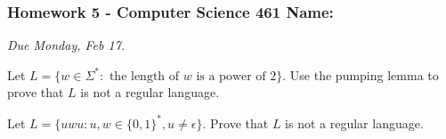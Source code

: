 \documentclass[12pt,answers]{exam}
\begin{document}
\pagestyle{empty}
\subsubsection*{Homework 5 - Computer Science 461 \hfill Name: \underline{\hspace*{2in}}}

\textit{Due Monday, Feb 17.} %

\begin{questions}


\question Let $L = \{w \in \Sigma^* : \text{ the length of }w\text{ is a power of 2} \}$. Use the pumping lemma to prove that $L$ is not a regular language.  

\vfill

\question Let $L = \{u w u : u, w \in \{0,1\}^*, u \ne \epsilon \}$. Prove that $L$ is not a regular language. 
\vfill


\vfill

\end{questions}
\end{document}
